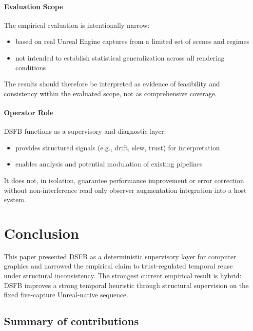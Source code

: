 \documentclass[11pt,letterpaper]{article}
\theoremstyle{gcresult}
\theoremstyle{definition}
\begin{document}
\paragraph{Evaluation Scope}
The empirical evaluation is intentionally narrow:
\begin{itemize}
    \item based on real Unreal Engine captures from a limited set of scenes and regimes
    \item not intended to establish statistical generalization across all rendering conditions
\end{itemize}
The results should therefore be interpreted as evidence of feasibility and consistency within the evaluated scope, not as comprehensive coverage.

\paragraph{Operator Role}
DSFB functions as a supervisory and diagnostic layer:
\begin{itemize}
    \item provides structured signals (e.g., drift, slew, trust) for interpretation
    \item enables analysis and potential modulation of existing pipelines
\end{itemize}
It does not, in isolation, guarantee performance improvement or error correction without non-interference read only observer augmentation integration into a host system.



\section{Conclusion}
\label{sec:conclusion}

This paper presented DSFB as a deterministic supervisory layer for computer graphics and narrowed the empirical claim to trust-regulated temporal reuse under structural inconsistency. The strongest current empirical result is hybrid: DSFB improves a strong temporal heuristic through structural supervision on the fixed five-capture Unreal-native sequence.


\subsection{Summary of contributions}
\end{document}
